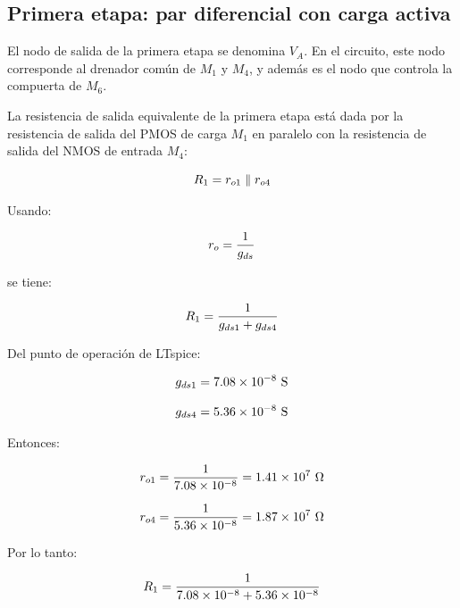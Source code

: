 \subsection*{Primera etapa: par diferencial con carga activa}

El nodo de salida de la primera etapa se denomina \(V_A\). En el circuito, este nodo corresponde al drenador común de \(M_1\) y \(M_4\), y además es el nodo que controla la compuerta de \(M_6\).

La resistencia de salida equivalente de la primera etapa está dada por la resistencia de salida del PMOS de carga \(M_1\) en paralelo con la resistencia de salida del NMOS de entrada \(M_4\):

\begin{equation}\notag
R_1=r_{o1}\parallel r_{o4}
\end{equation}

Usando:

\begin{equation}\notag
r_o=\frac{1}{g_{ds}}
\end{equation}

se tiene:

\begin{equation}\notag
R_1=
\frac{1}{g_{ds1}+g_{ds4}}
\end{equation}

Del punto de operación de LTspice:

\begin{equation}\notag
g_{ds1}=7.08\times 10^{-8}\ \mathrm{S}
\end{equation}

\begin{equation}\notag
g_{ds4}=5.36\times 10^{-8}\ \mathrm{S}
\end{equation}

Entonces:

\begin{equation}\notag
r_{o1}=
\frac{1}{7.08\times 10^{-8}}
=
1.41\times 10^{7}\ \Omega
\end{equation}

\begin{equation}\notag
r_{o4}=
\frac{1}{5.36\times 10^{-8}}
=
1.87\times 10^{7}\ \Omega
\end{equation}

Por lo tanto:

\begin{equation}\notag
R_1=
\frac{1}{7.08\times 10^{-8}+5.36\times 10^{-8}}
\end{equation}


